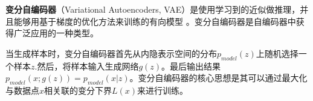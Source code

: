
\textbf{变分自编码器}（Variational Autoencoders, VAE）是使用学习到的近似做推理，并且能够用基于梯度的优化方法来训练的有向模型 \cite{GDL}。变分自编码器是自编码器中获得广泛应用的一种类型。

当生成样本时，变分自编码器首先从内隐表示空间的分布$p_{model}(z)$上随机选择一个样本$z$.然后，将样本输入生成网络$g(z)$。最后输出结果$p_{model}(x;g(z))=p_{model}(x|z)$。变分自编码器的核心思想是其可以通过最大化与数据点$x$相关联的变分下界$L(x)$来进行训练。

